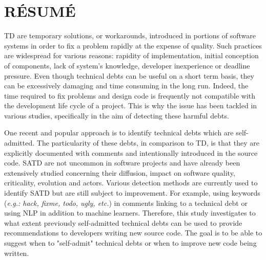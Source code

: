 %
%


\chapter*{RÉSUMÉ}\thispagestyle{headings}

\setlength{\parindent}{5ex} \ac{TD} are temporary solutions, or workarounds, introduced in portions of software systems in order to fix a problem rapidly at the expense of quality. Such practices are widespread for various reasons: rapidity of implementation, initial conception of components, lack of system's knowledge, developer inexperience or deadline pressure. Even though technical debts can be useful on a short term basis, they can be excessively damaging and time consuming in the long run. Indeed, the time required to fix problems and design code is frequently not compatible with the development life cycle of a project. This is why the issue has been tackled in various studies, specifically in the aim of detecting these harmful debts. \par

One recent and popular approach is to identify technical debts which are self-admitted. The particularity of these debts, in comparison to \ac{TD}, is that they are explicitly documented with comments and intentionally introduced in the source code. \ac{SATD} are not uncommon in software projects and have already been extensively studied concerning their diffusion, impact on software quality, criticality, evolution and actors. Various detection methods are currently used to identify \ac{SATD} but are still subject to improvement. For example, using keywords (\emph{e.g.: hack, fixme, todo, ugly, etc.}) in comments linking to a technical debt or using \ac{NLP} in addition to machine learners. Therefore, this study investigates to what extent previously self-admitted technical debts can be used to provide recommendations to developers writing new source code. The goal is to be able to suggest when to "self-admit" technical debts or when to improve new code being written. \par

